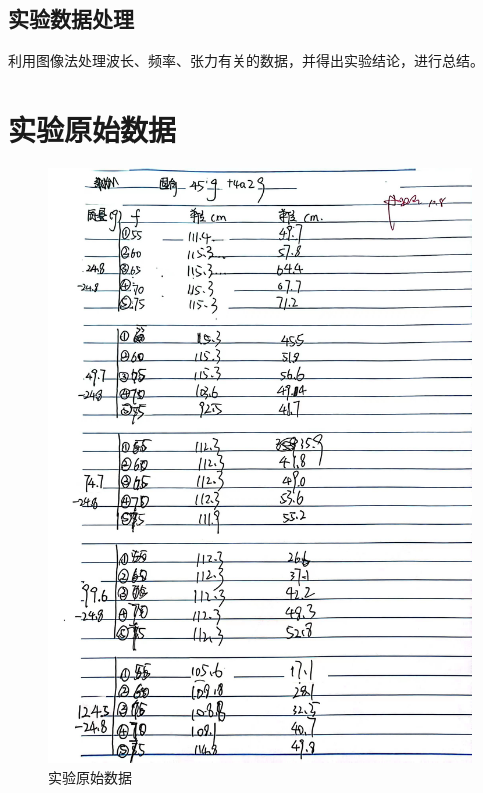 \documentclass{ctexart}
\begin{document}
  \subsection{实验数据处理}
  利用图像法处理波长、频率、张力有关的数据，并得出实验结论，进行总结。
\newpage

\section{实验原始数据}
\begin{figure}[h]
  \centering
  \includegraphics[height=1\textwidth,width=1\textwidth]{shiyanshujv.jpg}
  \caption{实验原始数据}\label{shiyanshujv}
\end{figure}
\newpage
\end{document}
